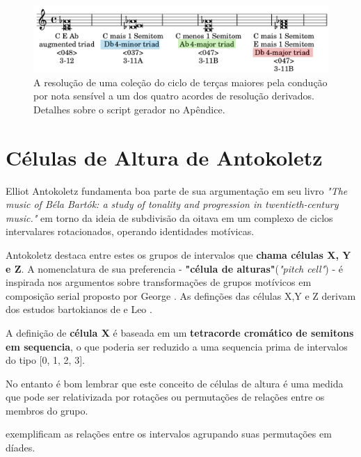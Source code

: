 \documentclass[
	12pt,				%
	openright,			%
	twoside,			%
	a4paper,			%
	english,			%
	french,				%
	spanish,			%
	brazil				%
	]{abntex2}
\begin{document}
\begin{figure}[!h]
	\caption{\label{fig_grafico}A resolução de uma coleção do ciclo de terças maiores pela condução por nota sensível a um dos quatro acordes de resolução derivados. Detalhes sobre o script gerador no Apêndice.   }
	\begin{center}
	    \includegraphics[scale=0.3]{ciclos/transpoe_triades_aumentadas.png}
	\end{center}
\end{figure}
\pagebreak



\section{Células de Altura de Antokoletz}
\label{celZ}

Elliot Antokoletz fundamenta boa parte de sua argumentação em seu livro \textit{"The music of Béla Bartók: a study of tonality and progression in twentieth-century music."}\cite{antokoletz1984music} em torno da ideia de subdivisão da oitava em um complexo de ciclos intervalares rotacionados, operando identidades motívicas. 

Antokoletz destaca entre estes os grupos de intervalos que \textbf{chama células X, Y e Z}\cite[ p.69-77]{antokoletz1984music}. A nomenclatura de sua preferencia - \textbf{"célula de alturas"}(\textit{"pitch cell"}) - é inspirada nos argumentos sobre transformações de grupos motívicos em composição serial proposto por George . As definções das células X,Y e Z derivam dos estudos bartokianos de  e Leo .

A definição de \textbf{célula X } é baseada em um \textbf{tetracorde cromático de semitons em sequencia}, o que poderia ser reduzido a uma sequencia prima de intervalos do tipo [0, 1, 2, 3]. 

No entanto é bom lembrar que este conceito de células de altura é uma medida que pode ser relativizada por rotações ou permutações de relações entre os membros do grupo.

 exemplificam as relações entre os intervalos agrupando suas permutações em díades.
\end{document}
